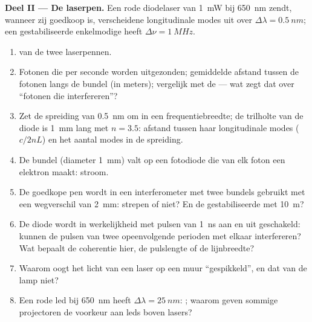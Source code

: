 \begin{problem}
\medskip
\noindent\textbf{Deel II --- De laserpen.}
Een rode diodelaser van \qty{1}{mW} bij \qty{650}{nm} zendt, wanneer zij
goedkoop is, verscheidene longitudinale modes uit over
$\Delta\lambda = \qty{0.5}{nm}$; een gestabiliseerde enkelmodige heeft
$\Delta\nu = \qty{1}{MHz}$.
\begin{enumerate}[resume]
  \item {} van de twee laserpennen.
  \item Fotonen die per seconde worden uitgezonden; gemiddelde afstand
        tussen de fotonen langs de bundel (in meters); vergelijk met de
         --- wat zegt dat over ``fotonen die interfereren''?
  \item Zet de spreiding van \qty{0.5}{nm} om in een frequentiebreedte; de
        trilholte van de diode is \qty{1}{mm} lang met $n = 3.5$: afstand
        tussen haar longitudinale modes ($c/2nL$) en het aantal modes in de
        spreiding.
  \item De bundel (diameter \qty{1}{mm}) valt op een fotodiode die van elk
        foton een elektron maakt: stroom.
  \item De goedkope pen wordt in een interferometer met twee bundels
        gebruikt met een wegverschil van \qty{2}{mm}: strepen of niet? En de
        gestabiliseerde met \qty{10}{m}?
  \item De diode wordt in werkelijkheid met pulsen van \qty{1}{ns} aan en
        uit geschakeld: kunnen de pulsen van twee opeenvolgende perioden met
        elkaar interfereren? Wat bepaalt de coherentie hier, de pulslengte
        of de lijnbreedte?
  \item Waarom oogt het licht van een laser op een muur ``gespikkeld'', en
        dat van de lamp niet?
  \item Een rode led bij \qty{650}{nm} heeft $\Delta\lambda = \qty{25}{nm}$:
        ; waarom geven sommige projectoren de voorkeur aan
        leds boven lasers?
\end{enumerate}


\end{problem}
